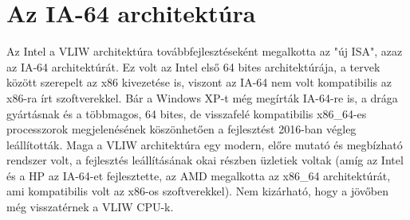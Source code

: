 \section{Az IA-64 architektúra}
Az Intel a VLIW architektúra továbbfejlesztéseként megalkotta az "új ISA", azaz az IA-64 architektúrát.
Ez volt az Intel első 64 bites architektúrája, a tervek között szerepelt az x86 kivezetése is, viszont az IA-64 nem volt kompatibilis az x86-ra írt szoftverekkel.
Bár a Windows XP-t még megírták IA-64-re is, a drága gyártásnak és a többmagos, 64 bites, de visszafelé kompatibilis x86\_64-es processzorok megjelenésének köszönhetően a fejlesztést 2016-ban végleg leállították.
Maga a VLIW architektúra egy modern, előre mutató és megbízható rendszer volt, a fejlesztés leállításának okai részben üzletiek voltak (amíg az Intel és a HP az IA-64-et fejlesztette, az AMD megalkotta az x86\_64 architektúrát, ami kompatibilis volt az x86-os szoftverekkel).
Nem kizárható, hogy a jövőben még visszatérnek a VLIW CPU-k.